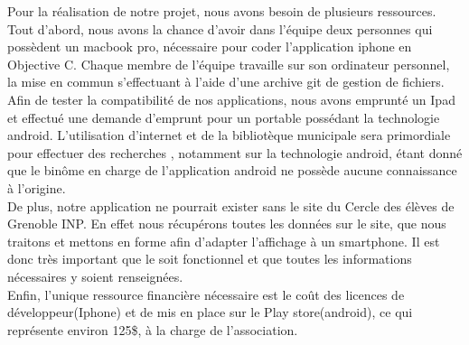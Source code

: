 \documentclass[a4paper,11pt]{article}
\begin{document}
Pour la réalisation de notre projet, nous avons besoin de plusieurs ressources. Tout d'abord, nous avons la chance d'avoir dans l'équipe deux personnes qui possèdent un macbook pro, nécessaire pour coder l'application iphone en Objective C. Chaque membre de l'équipe travaille sur son ordinateur personnel, la mise en commun s'effectuant à l'aide d'une archive git de gestion de fichiers. Afin de tester la compatibilité de nos applications, nous avons emprunté un Ipad et effectué une demande d'emprunt pour un portable possédant la technologie android. L'utilisation d'internet et de la bibliotèque municipale sera primordiale pour effectuer des recherches , notamment sur la technologie android, étant donné que le binôme en charge de l'application android ne possède aucune connaissance à l'origine.\\
De plus, notre application ne pourrait exister sans le site du Cercle des élèves de Grenoble INP. En effet nous récupérons toutes les données sur le site, que nous traitons et mettons  en forme afin d'adapter l'affichage à un smartphone. Il est donc très important que le soit fonctionnel et que toutes les informations nécessaires y soient renseignées.\\ 
Enfin, l'unique ressource financière nécessaire est le coût des licences de développeur(Iphone) et de mis en place sur le Play store(android), ce qui représente environ 125\$, à la charge de l'association. 
\end{document}
